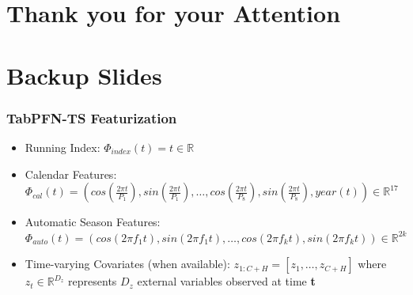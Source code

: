 \documentclass[t,aspectratio=169,svgnames]{beamer}
\begin{document}
\section{Thank you for your Attention}
\section{Backup Slides}
\begin{frame}
\frametitle{TabPFN-TS Featurization}
\begin{itemize}
    \item Running Index: $\Phi_{index}(t) = t \in \mathbb{R}$

    \item Calendar Features: $\Phi_{cal}(t)=\left(cos\left(\frac{2 \pi t}{P_1}\right), sin\left(\frac{2 \pi t}{P_1}\right), …, cos\left(\frac{2 \pi t}{P_8}\right), sin\left(\frac{2 \pi t}{P_8}\right), year(t)\right) \in \mathbb{R}^{17}$ %

    \item Automatic Season Features: $\Phi_{auto}(t) = (cos(2\pi f_1 t), sin(2 \pi f_1 t), …, cos(2\pi f_k t), sin(2 \pi f_k t)) \in \mathbb{R}^{2k}$

    \item Time-varying Covariates (when available): $z_{1:C+H} = [z_1, …, z_{C+H}]$ where $z_t \in \mathbb{R}^{D_{z}}$ represents $D_z$ external variables observed at time \textbf{t}
\end{itemize}
\end{frame}
\end{document}
